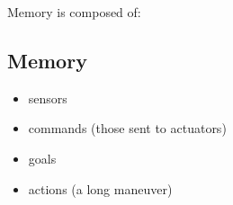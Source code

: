 Memory is composed of:

\subsection{Memory}
\begin{itemize}
    \item sensors
    \item commands (those sent to actuators)
    \item goals
    \item actions (a long maneuver)
\end{itemize}